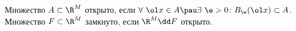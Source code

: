 
	 Множество $A\subset\R^M$ открыто, если $\forall\ \ol x\in A\pau \exists\ \e>0\colon B_\e(\ol x)\subset A$.
	 Множество $F\subset\R^M$ замкнуто, если $\R^M\dd F$ открыто.
	 